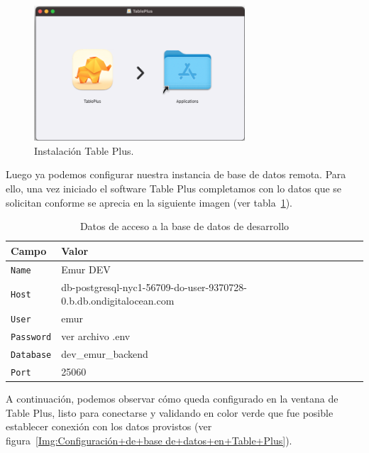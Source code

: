 \begin{figure}[h]
    \centering
    \includegraphics[width=0.7\textwidth]{img/manual/instalacion-table-plus.png}
    \caption{Instalación Table Plus.} \label{Img:Instalación+Table+Plus}
\end{figure} 

Luego ya podemos configurar nuestra instancia de base de datos remota. Para ello, una vez iniciado el software Table Plus completamos con lo datos que se solicitan conforme se aprecia en la siguiente imagen (ver tabla~\ref{tab:requisitos-table-plus}).

\begin{table}[H]
\centering
\begin{tabular}{ll}
\toprule
Campo                     & Valor                           \\
\midrule
\texttt{Name}       & Emur DEV              \\
\texttt{Host}      & db-postgresql-nyc1-56709-do-user-9370728-0.b.db.ondigitalocean.com             \\
\texttt{User}      & emur             \\
\texttt{Password}      &  ver archivo .env      \\
\texttt{Database}      & dev\_emur\_backend           \\
\texttt{Port}      & 25060             \\
\bottomrule
\end{tabular}
\caption{Datos de acceso a la base de datos de desarrollo}
\label{tab:requisitos-table-plus}
\end{table}

A continuación, podemos observar cómo queda configurado en la ventana de Table Plus, listo para conectarse y validando en color verde que fue posible establecer conexión con los datos provistos (ver figura~\ref{Img:Configuración+de+base de+datos+en+Table+Plus}).

